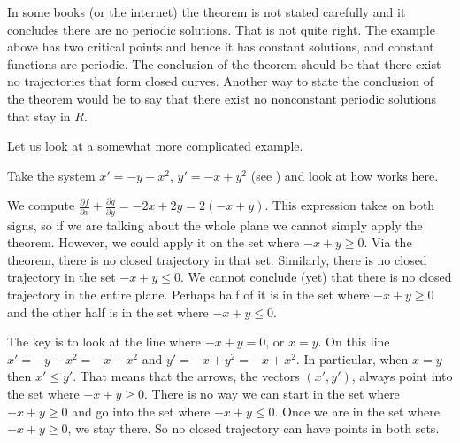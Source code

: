 In some books (or the internet) the theorem is not stated carefully
and it concludes there are no periodic solutions.  That is not quite
right.  The example above has two critical points and hence it has
constant solutions, and constant functions are periodic.  The conclusion of
the theorem should be that there exist no trajectories that form closed
curves.  Another way to state the conclusion of the theorem would be to
say that there exist no nonconstant periodic solutions that stay in $R$.

Let us look at a somewhat more complicated example.

\begin{example}
Take the system $x'=-y-x^2$, $y'=-x+y^2$ (see
) and look at how  works here.
\end{example}
\begin{exampleSol}
We compute
$\frac{\partial f}{\partial x} + \frac{\partial g}{\partial y} =
-2x + 2y=2(-x+y)$.  This expression takes on both signs, so if we are talking about the
whole plane we cannot simply apply the theorem.  However, we could apply it
on the set where $-x+y \geq 0$.  Via the theorem, there is no
closed trajectory in that set.  Similarly, there is no closed trajectory
in the set $-x+y \leq 0$.  We cannot conclude (yet) that there is no closed
trajectory in the entire plane.  Perhaps half of it is in the set where
$-x+y \geq 0$ and the other half is in the set where $-x+y \leq 0$.

The key is to look at the line where $-x+y=0$, or $x=y$.  On this line
$x' = -y-x^2 = -x-x^2$ and $y' = -x+y^2 = -x+x^2$.  In particular,
when $x=y$ then $x' \leq y'$.  That means that the arrows, the vectors
$(x',y')$, always point
into the set where $-x+y \geq 0$.  There is no way we can start in the
set where $-x+y \geq 0$
and go into the set where $-x+y \leq 0$.  Once we are in
the set where $-x+y \geq 0$, we stay there.  So no closed trajectory can
have points in both sets.
%
\end{exampleSol}


